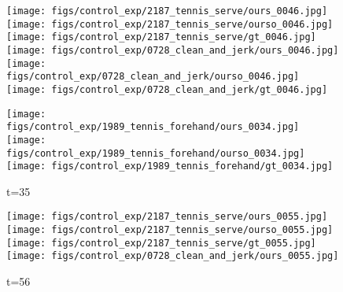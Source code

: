 \documentclass{article}
\begin{document}
\begin{appendix}
\begin{figure*}[!thbp]
\begin{subfigure}{0.12\linewidth}
	\end{subfigure}
	\begin{subfigure}{0.12\linewidth}
        \caption*{t=47}
        \vspace{-7pt}
	    \texttt{[image: figs/control\_exp/2187\_tennis\_serve/ours\_0046.jpg]}
	    \texttt{[image: figs/control\_exp/2187\_tennis\_serve/ourso\_0046.jpg]}
	    \vspace{.2cm}
  		\texttt{[image: figs/control\_exp/2187\_tennis\_serve/gt\_0046.jpg]}
  		\texttt{[image: figs/control\_exp/0728\_clean\_and\_jerk/ours\_0046.jpg]}
  		\texttt{[image: figs/control\_exp/0728\_clean\_and\_jerk/ourso\_0046.jpg]}
  		\vspace{.2cm}
  		\texttt{[image: figs/control\_exp/0728\_clean\_and\_jerk/gt\_0046.jpg]}
  		\caption*{t=35}
  		\vspace{-7pt}
  		\texttt{[image: figs/control\_exp/1989\_tennis\_forehand/ours\_0034.jpg]}
  		\texttt{[image: figs/control\_exp/1989\_tennis\_forehand/ourso\_0034.jpg]}
  		\vspace{.2cm}
  		\texttt{[image: figs/control\_exp/1989\_tennis\_forehand/gt\_0034.jpg]}
	\end{subfigure}
	\begin{subfigure}{0.12\linewidth}
        \caption*{t=56}
        \vspace{-7pt}
	    \texttt{[image: figs/control\_exp/2187\_tennis\_serve/ours\_0055.jpg]}
	    \texttt{[image: figs/control\_exp/2187\_tennis\_serve/ourso\_0055.jpg]}
	    \vspace{.2cm}
  		\texttt{[image: figs/control\_exp/2187\_tennis\_serve/gt\_0055.jpg]}
  		\texttt{[image: figs/control\_exp/0728\_clean\_and\_jerk/ours\_0055.jpg]}

\end{subfigure}
\end{figure*}
\end{appendix}
\end{document}
